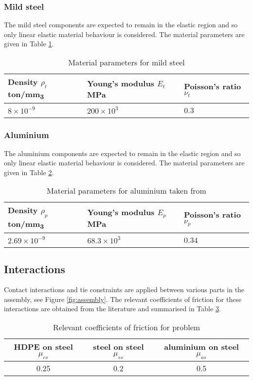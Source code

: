 \documentclass{article}
\begin{document}
\subsubsection{Mild steel}
The mild steel components are expected to remain in the elastic region and so only linear elastic material behaviour is considered. The material parameters are given in Table \ref{tab:mild-steel-mat-params}.
\begin{table}[!htb]
	\newcommand{\colsize}{2.cm}
	\centering
	\caption{Material parameters for mild steel }
	\label{tab:mild-steel-mat-params}
	\begin{tabular}{p{\colsize}| p{\colsize} | p{\colsize} }
		Density $\rho_{t}$ ton/mm\textsubscript{3}  & Young's modulus $E_{t}$ MPa & Poisson's ratio $\nu_{t}$ \\
		\hline\hline
	$8\times 10^{-9}$ & $200\times10^{3}$ & 0.3
	\end{tabular}
\end{table}



\subsubsection{Aluminium}
The aluminium components are expected to remain in the elastic region and so only linear elastic material behaviour is considered. The material parameters are given in Table \ref{tab:aluminium-mat-params}.
\begin{table}[!htb]
	\newcommand{\colsize}{2.cm}
	\centering
	\caption{Material parameters for aluminium taken from \cite{aluminium-props}}
	\label{tab:aluminium-mat-params}
	\begin{tabular}{p{\colsize}| p{\colsize} | p{\colsize} }
		Density $\rho_{p}$ ton/mm\textsubscript{3}  & Young's modulus $E_{p}$ MPa & Poisson's ratio $\nu_{p}$ \\
		\hline\hline
		$2.69\times 10^{-9}$ & $68.3\times10^{3}$ & 0.34
	\end{tabular}
\end{table}

\subsection{Interactions}
Contact interactions and tie constraints are applied between various parts in the assembly, see Figure \ref{fig:assembly}. The relevant coefficients of friction for these interactions are obtained from the literature and summarised in Table \ref{tab:ceof}.
\begin{table}[!htb]
	\centering
	\caption{Relevant coefficients of friction for problem}
	\label{tab:ceof}
	\begin{tabular}{c | c | c}
		HDPE on steel $\mu_{cs}$ \cite{kinsella2005experimental} & steel on steel $\mu_{ss}$ \cite{trzepiecinski2019study} & aluminium on steel $\mu_{as}$ \cite{javadi2006experimental} \\
		\hline \hline
		0.25 & 0.2 & 0.5
	\end{tabular}
\end{table}
\end{document}
